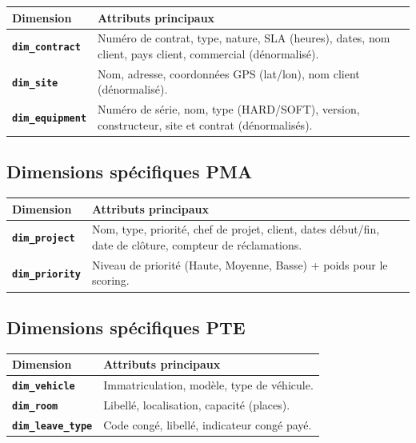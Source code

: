 \documentclass[a4paper,12pt]{article}
\begin{document}
\begin{tabularx}{\textwidth}{>{\bfseries}p{3.5cm} X}
\toprule
Dimension & Attributs principaux \\
\midrule
\texttt{dim\_contract} & Numéro de contrat, type, nature, SLA (heures), dates,
                         nom client, pays client, commercial (dénormalisé). \\
\texttt{dim\_site}     & Nom, adresse, coordonnées GPS (lat/lon), nom client (dénormalisé). \\
\texttt{dim\_equipment}& Numéro de série, nom, type (HARD/SOFT), version, constructeur,
                         site et contrat (dénormalisés). \\
\bottomrule
\end{tabularx}

\subsection{Dimensions spécifiques PMA}

\begin{tabularx}{\textwidth}{>{\bfseries}p{3.5cm} X}
\toprule
Dimension & Attributs principaux \\
\midrule
\texttt{dim\_project}  & Nom, type, priorité, chef de projet, client, dates début/fin,
                         date de clôture, compteur de réclamations. \\
\texttt{dim\_priority} & Niveau de priorité (Haute, Moyenne, Basse) + poids pour le scoring. \\
\bottomrule
\end{tabularx}

\subsection{Dimensions spécifiques PTE}

\begin{tabularx}{\textwidth}{>{\bfseries}p{3.5cm} X}
\toprule
Dimension & Attributs principaux \\
\midrule
\texttt{dim\_vehicle}    & Immatriculation, modèle, type de véhicule. \\
\texttt{dim\_room}       & Libellé, localisation, capacité (places). \\
\texttt{dim\_leave\_type}& Code congé, libellé, indicateur congé payé. \\
\bottomrule
\end{tabularx}

\end{document}
